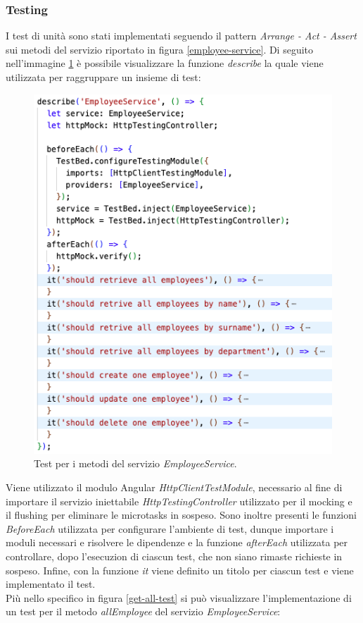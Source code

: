 \subsubsection*{Testing}
I test di unità sono stati implementati seguendo il pattern \textit{Arrange - Act - Assert} sui metodi del servizio riportato in figura \ref{employee-service}. Di seguito nell'immagine \ref{employee-service-tests} è possibile visualizzare la funzione \textit{describe} la quale viene utilizzata per raggruppare un insieme di test:
\FloatBarrier
\begin{figure}[!ht]
\centering
\includegraphics[width=0.6\linewidth]{immagini/employeeServiceTest.png}
\caption{Test per i metodi del servizio \textit{EmployeeService}.}
\label{employee-service-tests}
\end{figure}
\FloatBarrier
Viene utilizzato il modulo Angular \textit{HttpClientTestModule}, necessario al fine di importare il servizio iniettabile \textit{HttpTestingController} utilizzato per il mocking e il flushing per eliminare le microtasks in sospeso. Sono inoltre presenti le funzioni \textit{BeforeEach} utilizzata per configurare l'ambiente di test, dunque importare i moduli necessari e risolvere le dipendenze e la funzione \textit{afterEach} utilizzata per controllare, dopo l'esecuzion di ciascun test, che non siano rimaste richieste in sospeso. Infine, con la funzione \textit{it} viene definito un titolo per ciascun test e viene implementato il test.\\
Più nello specifico in figura \ref{get-all-test} si può visualizzare l'implementazione di un test per il metodo \textit{allEmployee} del servizio \textit{EmployeeService}:
\FloatBarrier
